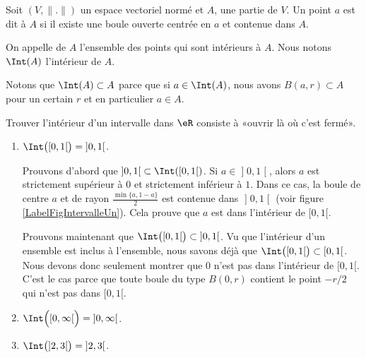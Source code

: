 \begin{definition}
	Soit $(V,\| . \|)$ un espace vectoriel normé et $A$, une partie de $V$. Un point $a$ est dit  à $A$ si il existe une boule ouverte centrée en $a$ et contenue dans $A$.

	On appelle  de $A$ l'ensemble des points qui sont intérieurs à $A$. Nous notons $\Int(A)$ l'intérieur de $A$.
\end{definition}
Notons que $\Int(A)\subset A$ parce que si $a\in\Int(A)$, nous avons $B(a,r)\subset A$ pour un certain $r$ et en particulier $a\in A$.

\begin{example}
	Trouver l'intérieur d'un intervalle dans $\eR$ consiste à «ouvrir là où c'est fermé». 
	\begin{enumerate}

		\item
			$\Int\big(\mathopen[ 0 , 1 [\big)=\mathopen] 0 , 1 \mathclose[$. 
			
			Prouvons d'abord que $\mathopen] 0,1  \mathclose[\subset\Int(\mathopen[ 0 , 1 [)$. Si $a\in\mathopen] 0 , 1 \mathclose[$, alors $a$ est strictement supérieur à $0$ et strictement inférieur à $1$. Dans ce cas, la boule de centre $a$ et de rayon $\frac{ \min\{ a,1-a \} }{ 2 }$ est contenue dans $\mathopen] 0 , 1 \mathclose[$ (voir figure \ref{LabelFigIntervalleUn}). Cela prouve que $a$ est dans l'intérieur de $\mathopen[ 0 , 1 [$.

\newcommand{\CaptionFigIntervalleUn}{Trouver le rayon d'une boule autour de $a$. Une boule qui serait centrée en $a$ avec un rayon strictement plus petit à la fois de $a$ et de $1-a$ est entièrement contenue dans le segment $\mathopen] 0 , 1 \mathclose[$.}


			Prouvons maintenant que $\Int\big( \mathopen[ 0 , 1 [ \big)\subset\mathopen] 0 , 1 \mathclose[$. Vu que l'intérieur d'un ensemble est inclus à l'ensemble, nous savons déjà que $\Int\big( \mathopen[ 0 , 1 [ \big)\subset\mathopen[ 0 , 1 [$. Nous devons donc seulement montrer que $0$ n'est pas dans l'intérieur de $\mathopen[ 0 , 1 [$. C'est le cas parce que toute boule du type $B(0,r)$ contient le point $-r/2$ qui n'est pas dans $\mathopen[ 0 , 1 [$.

		\item
			$\Int\Big( \mathopen[ 0 , \infty [ \Big)=\mathopen] 0 , \infty \mathclose[$.
		\item
			$\Int\big( \mathopen] 2 , 3 \mathclose[ \big)=\mathopen] 2 , 3 \mathclose[$.

	\end{enumerate}
	
\end{example}

